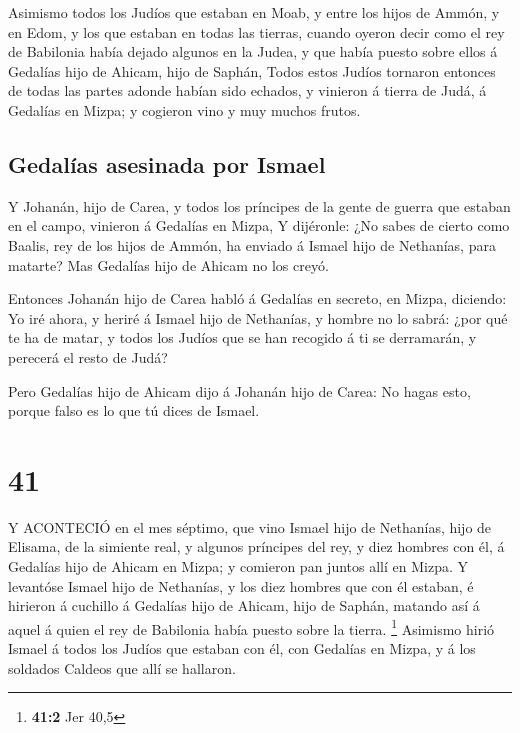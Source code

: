  Asimismo todos los Judíos que estaban en Moab, y entre los
hijos de Ammón, y en Edom, y los que estaban en todas las tierras,
cuando oyeron decir como el rey de Babilonia había dejado algunos en la
Judea, y que había puesto sobre ellos á Gedalías hijo de Ahicam, hijo de
Saphán,  Todos estos Judíos tornaron entonces de todas las
partes adonde habían sido echados, y vinieron á tierra de Judá, á
Gedalías en Mizpa; y cogieron vino y muy muchos frutos.

\hypertarget{gedaluxedas-asesinada-por-ismael}{%
\subsection{Gedalías asesinada por
Ismael}\label{gedaluxedas-asesinada-por-ismael}}

 Y Johanán, hijo de Carea, y todos los príncipes de la
gente de guerra que estaban en el campo, vinieron á Gedalías en Mizpa,
 Y dijéronle: ¿No sabes de cierto como Baalis, rey de los
hijos de Ammón, ha enviado á Ismael hijo de Nethanías, para matarte? Mas
Gedalías hijo de Ahicam no los creyó.

 Entonces Johanán hijo de Carea habló á Gedalías en
secreto, en Mizpa, diciendo: Yo iré ahora, y heriré á Ismael hijo de
Nethanías, y hombre no lo sabrá: ¿por qué te ha de matar, y todos los
Judíos que se han recogido á ti se derramarán, y perecerá el resto de
Judá?

 Pero Gedalías hijo de Ahicam dijo á Johanán hijo de Carea:
No hagas esto, porque falso es lo que tú dices de Ismael.

\hypertarget{section-40}{%
\section{41}\label{section-40}}

 Y ACONTECIÓ en el mes séptimo, que vino Ismael hijo de
Nethanías, hijo de Elisama, de la simiente real, y algunos príncipes del
rey, y diez hombres con él, á Gedalías hijo de Ahicam en Mizpa; y
comieron pan juntos allí en Mizpa.  Y levantóse Ismael hijo
de Nethanías, y los diez hombres que con él estaban, é hirieron á
cuchillo á Gedalías hijo de Ahicam, hijo de Saphán, matando así á aquel
á quien el rey de Babilonia había puesto sobre la tierra. \footnote{\textbf{41:2}
  Jer 40,5}  Asimismo hirió Ismael á todos los Judíos que
estaban con él, con Gedalías en Mizpa, y á los soldados Caldeos que allí
se hallaron.

